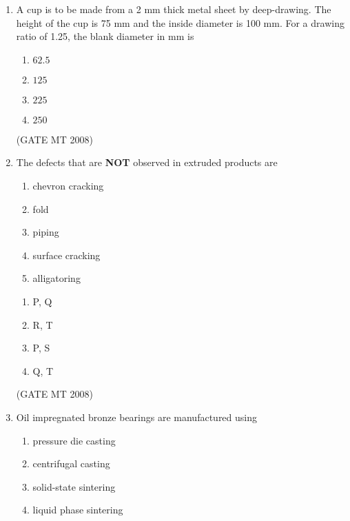\documentclass[journal, 11pt, onecolumn]{IEEEtran}
\theoremstyle{remark}
\begin{document}
\begin{enumerate}
\begin{multicols}{2}
\begin{enumerate} 
\item P-3, Q-2, R-1, S-4
\item P-4, Q-3, R-2, S-1
\item P-1, Q-3, R-4, S-2
\item P-3, Q-2, R-4, S-1
\end{enumerate}
\end{multicols}
\hfill(GATE MT 2008)

\item A cup is to be made from a 2 mm thick metal sheet by deep-drawing. 
The height of the cup is 75 mm and the inside diameter is 100 mm. 
For a drawing ratio of 1.25, the blank diameter in mm is
\begin{multicols}{4}
\begin{enumerate} 
\item $62.5$
\item $125$
\item $225$
\item $250$
\end{enumerate}
\end{multicols}
\hfill(GATE MT 2008)

\item The defects that are \textbf{NOT} observed in extruded products are
\begin{enumerate}[label=(\MakeUppercase{\alph*}), start=16]
\item chevron cracking
\item fold
\item piping
\item surface cracking
\item alligatoring
\end{enumerate}

\begin{multicols}{2}
\begin{enumerate} 
\item P, Q
\item R, T
\item P, S
\item Q, T
\end{enumerate}
\end{multicols}
\hfill(GATE MT 2008)
\item Oil impregnated bronze bearings are manufactured using
\begin{multicols}{2}
\begin{enumerate} 
\item pressure die casting
\item centrifugal casting
\item solid-state sintering
\item liquid phase sintering
\end{enumerate}
\end{multicols}



\end{enumerate}
\end{document}
